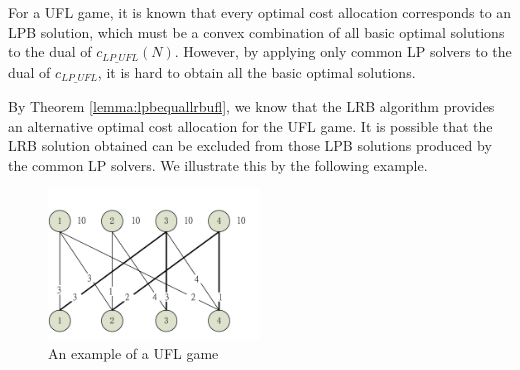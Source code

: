 \documentclass[ijoc,nonblindrev]{informs3} %
\begin{document}
For a UFL game, it is known that every optimal cost allocation corresponds to an LPB solution, which must be a convex combination of all basic optimal solutions to the dual of $c_{LP\_UFL}(N)$. However, by applying only common LP solvers to the dual of $c_{LP\_UFL}$, it is hard to obtain all the basic optimal solutions. 

By Theorem \ref{lemma:lpbequallrbufl}, we know that the LRB algorithm provides an alternative optimal cost allocation for the UFL game. It is possible that the LRB solution obtained can be excluded from those LPB solutions produced by the common LP solvers. We illustrate this by the following example.


%
%


\begin{figure}[H]
\centering
\vspace{-0.1em}
\includegraphics[width=0.5\textwidth]{preliminary-example.pdf}
\caption{\label{figure:exampleUFL}An example of a UFL game}
\vspace{-3mm}
\end{figure}
\end{document}
